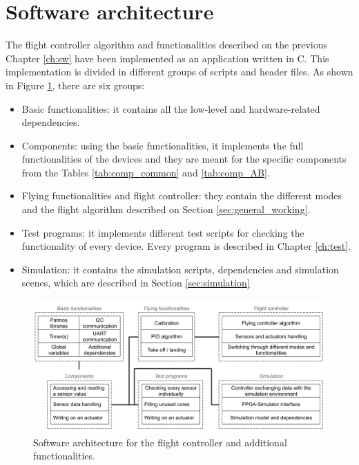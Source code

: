 \section{Software architecture}

The flight controller algorithm and functionalities described on the previous Chapter \ref{ch:sw} have been implemented as an application written in C. This implementation is divided in different groups of scripts and header files. As shown in Figure \ref{fig:imp_arch}, there are six groups:

\begin{itemize}
    \item Basic functionalities: it contains all the low-level and hardware-related dependencies.
    \item Components: using the basic functionalities, it implements the full functionalities of the devices and they are meant for the specific components from the Tables \ref{tab:comp_common} and \ref{tab:comp_AB}.
    \item Flying functionalities and flight controller: they contain the different modes and the flight algorithm described on Section \ref{sec:general_working}.
    \item Test programs: it implements different test scripts for checking the functionality of every device. Every program is described in Chapter \ref{ch:test}.
    \item Simulation: it contains the simulation scripts, dependencies and simulation scenes, which are described in Section \ref{sec:simulation}
\end{itemize}

\begin{figure} [H]
    \centering
    \includegraphics[width=\textwidth]{Figures/implementation/fc_architecture.png}
    \caption{Software architecture for the flight controller and additional functionalities.}
    \label{fig:imp_arch}
\end{figure}


